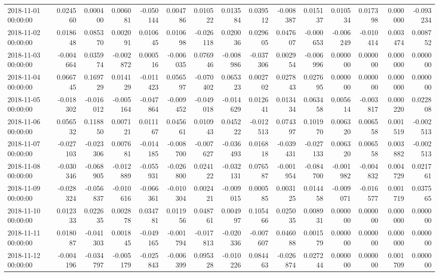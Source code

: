 \begin{tabular}{lrrrrrrrrrrrrrr}
2018-11-01 00:00:00 & 0.024560 & 0.000400 & 0.006081 & -0.050144 & 0.004786 & 0.010522 & 0.013584 & 0.039512 & -0.008387 & 0.015137 & 0.010534 & 0.017398 & 0.000000 & -0.093234 \\
2018-11-02 00:00:00 & 0.018648 & 0.085370 & 0.002091 & 0.010645 & 0.010698 & -0.026118 & 0.020036 & 0.029605 & 0.047607 & -0.000653 & -0.006249 & -0.010414 & 0.003474 & 0.008752 \\
2018-11-03 00:00:00 & -0.004664 & 0.035974 & -0.002872 & 0.000516 & -0.006035 & 0.076946 & -0.008986 & -0.037306 & 0.002954 & -0.006996 & 0.000000 & 0.000000 & 0.000000 & 0.000000 \\
2018-11-04 00:00:00 & 0.066745 & 0.169729 & 0.014129 & -0.011423 & 0.056597 & -0.070402 & 0.065323 & 0.002702 & 0.027843 & 0.027695 & 0.000000 & 0.000000 & 0.000000 & 0.000000 \\
2018-11-05 00:00:00 & -0.018302 & -0.016012 & -0.005164 & -0.047864 & -0.009452 & -0.049018 & -0.014629 & 0.012641 & 0.013434 & 0.063458 & 0.005614 & -0.003817 & 0.000220 & 0.022808 \\
2018-11-06 00:00:00 & 0.056532 & 0.118850 & 0.007121 & 0.011167 & 0.045661 & 0.010943 & 0.045222 & -0.012513 & 0.074397 & 0.101970 & 0.006320 & 0.006558 & 0.001519 & -0.002513 \\
2018-11-07 00:00:00 & -0.027103 & -0.023306 & 0.007681 & -0.014185 & -0.008700 & -0.007627 & -0.036493 & 0.016818 & -0.039431 & -0.027133 & 0.006320 & 0.006558 & 0.003882 & -0.002513 \\
2018-11-08 00:00:00 & -0.030346 & -0.068905 & -0.012889 & -0.055931 & -0.026800 & 0.024122 & -0.032131 & 0.076587 & -0.001954 & -0.084700 & -0.001982 & -0.004832 & 0.004729 & 0.021761 \\
2018-11-09 00:00:00 & -0.028324 & -0.056837 & -0.010616 & -0.066361 & -0.010304 & 0.002421 & -0.009015 & 0.000585 & 0.003125 & 0.014458 & -0.009071 & -0.016577 & 0.001719 & 0.037565 \\
2018-11-10 00:00:00 & 0.012333 & 0.022635 & 0.002878 & 0.034781 & 0.011956 & 0.048761 & 0.004997 & 0.105466 & 0.025035 & 0.008931 & 0.000000 & 0.000000 & 0.000000 & 0.000000 \\
2018-11-11 00:00:00 & 0.018087 & -0.041303 & 0.001845 & -0.049165 & -0.001794 & -0.017813 & -0.020336 & -0.007607 & 0.046088 & 0.001579 & 0.000000 & 0.000000 & 0.000000 & 0.000000 \\
2018-11-12 00:00:00 & -0.004196 & -0.034797 & -0.005179 & -0.025843 & -0.006399 & 0.095328 & -0.010226 & 0.084463 & -0.026874 & 0.027244 & 0.000000 & 0.000000 & 0.001709 & 0.000000 \\

\end{tabular}
